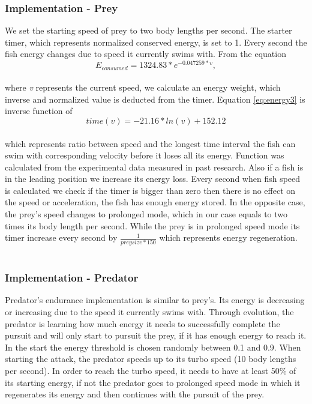 \documentclass[internal]{FRIreport}
\begin{document}
\subsubsection{Implementation - Prey}
We set the starting speed of prey to two body lengths per second. The starter timer, which represents normalized conserved energy, is set to 1. Every second the fish energy changes due to speed it currently swims with. From the equation 
~\\
\begin{equation} \label{eq:energy3}
E_{consumed} = 1324.83 * e^{-0.047259 * v},
\end{equation}
~\\
where \textit{v} 
represents the current speed, we calculate an energy weight, which inverse and normalized value is deducted from the timer. Equation \ref{eq:energy3} is inverse function of 
~\\
\begin{equation} \label{eq:energy4}
time(v) = -21.16*ln(v) + 152.12
\end{equation}
~\\
which represents ratio between speed and the longest time interval the fish can swim with corresponding velocity before it loses all its energy. Function was calculated from the experimental data measured in past research. Also if a fish is in the leading position we increase its energy loss. Every second when fish speed is calculated we check if the timer is bigger than zero then there is no effect on the speed or acceleration, 
the fish has enough energy stored. In the opposite case, the prey's speed changes to prolonged mode, which in our case equals to two times its body length per second. While the prey is in prolonged speed mode its timer increase every second by $\frac{1}{prey size * 150}$ which represents energy regeneration.
~\\\\
\subsubsection{Implementation - Predator}
Predator's endurance implementation is similar to prey's. Its energy is decreasing or increasing due to the speed it currently swims with. Through evolution, the predator is learning how much energy it needs to successfully complete the pursuit and will only start to pursuit the prey, if it has enough energy to reach it. In the start the energy threshold is chosen randomly between 0.1 and 0.9. When starting the attack, the predator speeds up to its turbo speed (10 body lengths per second). In order to reach the turbo speed, it needs to have at least 50\% of its starting energy, if not the predator goes to prolonged speed mode in which it regenerates its energy and then continues with the pursuit of the prey. 
\end{document}
